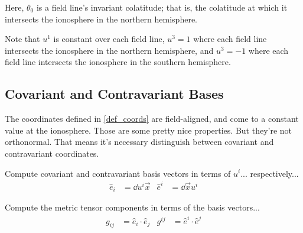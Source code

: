Here, $\theta_0$ is a field line's invariant colatitude; that is, the
colatitude at which it intersects the ionosphere in the northern hemisphere. 

Note that $u^1$ is constant over each field line, $u^3 = 1$ where each field
line intersects the ionosphere in the northern hemisphere, and $u^3 = -1$ where
each field line intersects the ionosphere in the southern hemisphere. 

\subsection{Covariant and Contravariant Bases}

The coordinates defined in \cref{def_coords} are field-aligned, and come to a constant value at the ionosphere. Those are some pretty nice properties. But they're not orthonormal. That means it's necessary distinguish between covariant and contravariant coordinates. 


Compute covariant and contravariant basis vectors in terms of $u^i$... respectively... 
\begin{align}
  \hat{e}_i & = \dd{u^i} \vec{x} & \hat{e}^i & = \dd{\vec{x}} u^i
\end{align}

Compute the metric tensor components in terms of the basis vectors... 
\begin{align}
  g_{ij} & = \hat{e}_i \cdot \hat{e}_j & g^{ij} & = \hat{e}^i \cdot \hat{e}^j
\end{align}

